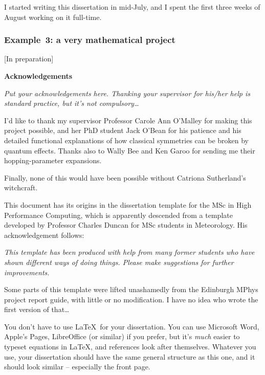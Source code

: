 \documentclass[12pt,a4paper]{report}
\numberwithin{equation}{section}
\theoremstyle{definition}
\theoremstyle{theorem}
\theoremstyle{theorem}
\theoremstyle{example}
\theoremstyle{definition}
\begin{document}
I started writing this dissertation in mid-July, and I spent the first
three weeks of August working on it full-time.



\subsubsection{Example~3: a very mathematical project}

[In preparation]



\newpage

\begin{center}
\textbf{Acknowledgements}
\end{center}

\emph{Put your acknowledgements here. Thanking your supervisor for his/her help is standard practice, but it's not compulsory\ldots}

I'd like to thank my supervisor Professor Carole Ann O'Malley for
making this project possible, and her PhD student Jack O'Bean for his
patience and his detailed functional explanations of how classical
symmetries can be broken by quantum effects. Thanks also to Wally Bee
and Ken Garoo for sending me their hopping-parameter expansions.

Finally, none of this would have been possible without Catriona
Sutherland's witchcraft.

\bigskip

This document has its origins in the dissertation template for the MSc
in High Performance Computing, which is apparently descended from a
template developed by Professor Charles Duncan for MSc students in
Meteorology. His acknowledgement follows:

\emph{This template has been produced with help from many former
  students who have shown different ways of doing things. Please make
  suggestions for further improvements.}

Some parts of this template were lifted unashamedly from the Edinburgh
MPhys project report guide, with little or no modification. I have no
idea who wrote the first version of that\ldots

You don't have to use \LaTeX\ for your dissertation. You can use
Microsoft Word, Apple's Pages, LibreOffice (or similar) if you prefer, but
it's \emph{much} easier to typeset equations in \LaTeX, and references
look after themselves. Whatever you use, your dissertation should have
the same general structure as this one, and it should look similar --
especially the front page.
\end{document}
